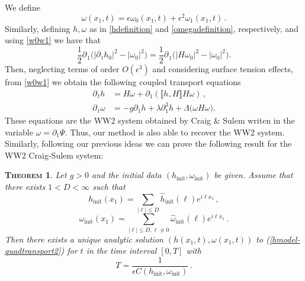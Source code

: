 \documentclass[11pt]{article}
\theoremstyle{plain}
\newtheorem{theorem}{\scshape Theorem}
\theoremstyle{definition}
\theoremstyle{definition}
\def\p{\text{\bf\emph{p}}}
\def\ft #1{{\widehat{#1}}}
\def\p{{\partial\hspace{1pt}}}
\def\comm#1#2{{\llbracket#1,#2\rrbracket}}
\def\hinit{h_{\operatorname{init}}}
\def\fhinit{\widehat{{ h}}_{\operatorname{init}}}
\begin{document}
We define
\begin{equation}\label{omegadefinition}
\omega(x_1,t)=  \epsilon \omega_0(x_1,t) + \epsilon ^2 \omega_1(x_1,t) \,.
\end{equation}
Similarly, defining $h,\omega$ as in \eqref{hdefinition} and \eqref{omegadefinition}, respectively, and using \eqref{w0w1} we have that
$$
\frac{1}{2} \p_{\!1} \big(|\p_t h_0|^2 - |\omega_0|^2 \big)=\frac{1}{2} \p_{\!1} \big(|H\omega_0|^2 - |\omega_0|^2 \big).
$$
Then, neglecting terms of order $O(\epsilon^3)$ and considering surface tension effects, from \eqref{w0w1} we obtain the following coupled transport equations
\begin{subequations}\label{hmodel-quadtransport2}
\begin{align}
\p_{\!t} h &=  H\omega + \partial_1\left(\comm{h}{H}H\omega\right)\,,\\
\p_{\!t} \omega &=  -g\partial_1 h+\lambda \partial_{1}^3 h+ \Lambda \big(\omega H \omega \big).
\end{align}
\end{subequations}
These equations are the WW2 system obtained by Craig \& Sulem writen in the variable $\omega=\partial_1\Psi.$ Thus, our method is also able to recover the WW2 system. Similarly, following our previous ideas we can prove the following result for the WW2 Craig-Sulem system:
\begin{theorem}\label{theorem1b} Let $g > 0$ and the initial data $(\hinit, \omega_{\operatorname{init}})$ be given. Assume that there exists $1<D<\infty$ such that
$$
\hinit(x_1)=\sum_{|\ell|\leq D}\fhinit(\ell)e^{i\ell x_1}\,,
$$
$$
\omega_{\operatorname{init}}(x_1)=\sum_{|\ell|\leq D,\ell\neq0}\ft{\omega}_{\operatorname{init}}(\ell)e^{i\ell x_1}\,.
$$
Then there exists a unique analytic solution $(h(x_1,t),\omega(x_1,t))$ to (\ref{hmodel-quadtransport2}) for $t$ in the time interval $[0,T]$ with
$$
T=\frac{1}{\epsilon C(\hinit,\omega_{\operatorname{init}})} \,.
$$
\end{theorem}
\end{document}
